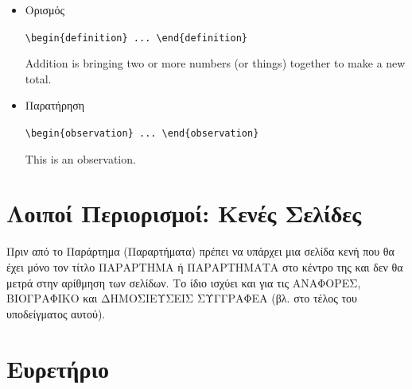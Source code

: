 \begin{itemize}
	\begin{center}\verb|\begin{remark} ... \end{remark}|\end{center}
	
	\begin{remark}
	This is a remark.
	\end{remark}
	
	\item Ορισμός
	
	\begin{center}\verb|\begin{definition} ... \end{definition}|\end{center}
	
	\begin{definition}
	Addition is bringing two or more numbers (or things) together to make a
	new total.
	\end{definition}
	
	\item Παρατήρηση
	
	\begin{center}\verb|\begin{observation} ... \end{observation}|\end{center}
	
	\begin{observation}
	This is an observation.
	\end{observation}
\end{itemize}


\section{Λοιποί Περιορισμοί: Κενές Σελίδες}
\label{sec:Restrictions}

{\color{red}
Πριν από το Παράρτημα (Παραρτήματα) πρέπει να υπάρχει μια σελίδα
κενή που θα έχει μόνο τον τίτλο ΠΑΡΑΡΤΗΜΑ ή ΠΑΡΑΡΤΗΜΑΤΑ στο κέντρο
της και δεν θα μετρά στην αρίθμηση των σελίδων.  Το ίδιο ισχύει
και για τις ΑΝΑΦΟΡΕΣ, ΒΙΟΓΡΑΦΙΚΟ και ΔΗΜΟΣΙΕΥΣΕΙΣ ΣΥΓΓΡΑΦΕΑ (βλ.
στο τέλος του υποδείγματος αυτού).}


\section{Ευρετήριο}
\label{sec:Index}

